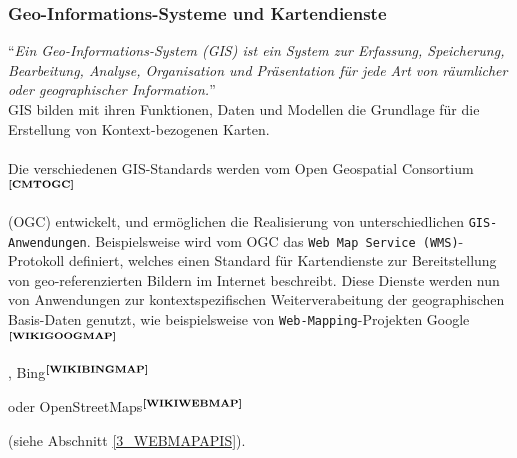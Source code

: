 \subsubsection{Geo-Informations-Systeme und Kartendienste}
"`\textit{Ein Geo-Informations-System (GIS) ist ein System zur Erfassung, Speicherung,  Bearbeitung, Analyse, Organisation und Präsentation für jede Art von räumlicher oder geographischer Information.}"'\cite{WIKI:GIS} \\
GIS bilden mit ihren Funktionen, Daten und Modellen die Grundlage für die Erstellung von Kontext-bezogenen Karten.\\ \\ %
Die verschiedenen GIS-Standards werden vom Open Geospatial Consortium$^{\textbf{\ref{CMTOGC}}}$%
\addtocounter{footnote}{1}%
 (OGC) entwickelt, und ermöglichen die Realisierung von unterschiedlichen \texttt{GIS-Anwendungen}. Beispielsweise wird vom OGC das \texttt{Web Map Service (WMS)}-Protokoll definiert, welches einen Standard für Kartendienste zur Bereitstellung von geo-referenzierten Bildern im Internet beschreibt.
Diese Dienste werden nun von Anwendungen zur kontextspezifischen Weiterverabeitung der geographischen Basis-Daten genutzt, wie beispielsweise von \texttt{Web-Mapping}-Projekten Google$^{\textbf{\ref{WIKIGOOGMAP}}}$%
\addtocounter{footnote}{1}%
, Bing$^{\textbf{\ref{WIKIBINGMAP}}}$%
\addtocounter{footnote}{1}%
oder OpenStreetMaps$^{\textbf{\ref{WIKIWEBMAP}}}$%
\addtocounter{footnote}{1}%
 (siehe Abschnitt \ref{3_WEBMAPAPIS}).

